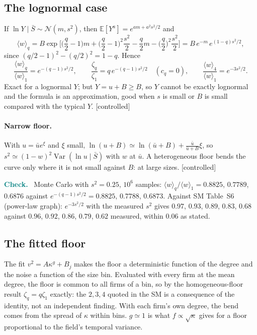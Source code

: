 \documentclass[11pt]{article}
\newcommand{\E}{\mathbb E}
\newcommand{\Var}{\operatorname{Var}}
\newcommand{\Sb}{\bar S}
\newcommand{\controlled}{\textsf{\small[controlled]}}
\newenvironment{verify}{\par\medskip\noindent\textcolor{teal}{\textbf{Check.}}\ }{\par\medskip}
\begin{document}
\subsection{The lognormal case}

If $\ln Y\mid\Sb\sim\mathcal N(m,s^2)$, then $\E[Y^a]=e^{am+a^2s^2/2}$ and
\begin{equation}
\langle w\rangle_q=B\exp\Big[\Big(\frac q2-1\Big)m+\Big(\frac q2-1\Big)^2\frac{s^2}2-\frac q2m-\Big(\frac q2\Big)^2\frac{s^2}2\Big]
=B\,e^{-m}\,e^{(1-q)s^2/2},
\end{equation}
since $(q/2-1)^2-(q/2)^2=1-q$.  Hence
\begin{equation}
\frac{\langle w\rangle_q}{\langle w\rangle_1}=e^{-(q-1)s^2/2},\qquad \frac{\zeta_q}{\zeta_1}=q\,e^{-(q-1)s^2/2}\quad(c_q=0),
\qquad\frac{\langle w\rangle_4}{\langle w\rangle_1}=e^{-3s^2/2}.
\end{equation}
Exact for a lognormal $Y$; but $Y=u+B\ge B$, so $Y$ cannot be exactly lognormal and the formula is an approximation, good
when $s$ is small or $B$ is small compared with the typical $Y$.  \controlled

\paragraph{Narrow floor.}  With $u=\bar ue^{\xi}$ and $\xi$ small, $\ln(u+B)\simeq\ln(\bar u+B)+\frac{\bar u}{\bar u+B}\xi$, so
$s^2\simeq(1-w)^2\Var(\ln u\mid\Sb)$ with $w$ at $\bar u$.  A heterogeneous floor bends the curve only where it is not small against
$B$: at large sizes.  \controlled

\begin{verify}
Monte Carlo with $s^2=0.25$, $10^6$ samples: $\langle w\rangle_q/\langle w\rangle_1=0.8825$, $0.7789$, $0.6876$ against $e^{-(q-1)s^2/2}=0.8825$, $0.7788$,
$0.6873$.  Against SM Table~S6 (power-law graph): $e^{-3s^2/2}$ with the measured $s^2$ gives $0.97$, $0.93$, $0.89$, $0.83$,
$0.68$ against $0.96$, $0.92$, $0.86$, $0.79$, $0.62$ measured, within $0.06$ as stated.
\end{verify}

\subsection{The fitted floor}

The fit $v^2=A\kappa^g+B_j$ makes the floor a deterministic function of the degree and the noise a function of the size bin.
Evaluated with every firm at the mean degree, the floor is common to all firms of a bin, so by the homogeneous-floor result
$\zeta_q=q\zeta_1$ exactly: the $2,3,4$ quoted in the SM is a consequence of the identity, not an independent finding.  With each
firm's own degree, the bend comes from the spread of $\kappa$ within bins.  $g\simeq1$ is what $f\propto\sqrt\kappa$ gives for a floor
proportional to the field's temporal variance.
\end{document}
